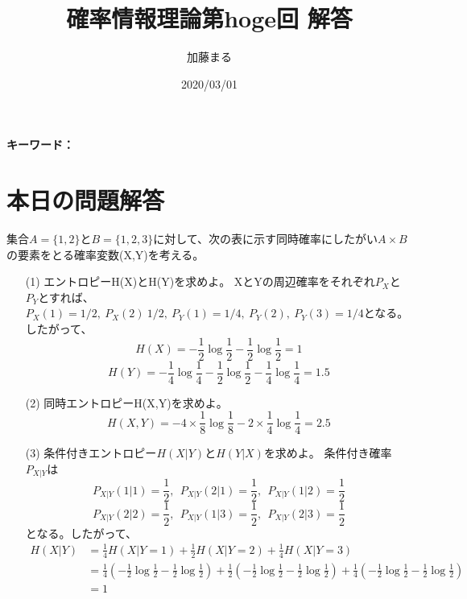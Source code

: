 \documentclass[a4j,uplatex,dvipdfmx]{jsarticle}
\title{確率情報理論第hoge回 解答}
\author{加藤まる}
\date{2020/03/01}
\begin{document}
\maketitle
\bf キーワード：
\rm

\section*{本日の問題解答}
集合$A=\{ 1,2\}$と$B=\{ 1,2,3 \}$に対して、次の表に示す同時確率にしたがい$A \times B$の要素をとる確率変数(X,Y)を考える。
\begin{itemize}
  \item[(1)]エントロピーH(X)とH(Y)を求めよ。
  XとYの周辺確率をそれぞれ$P_X$と$P_Y$とすれば、$P_X(1)=1/2,~P_X(2)~1/2,~P_Y(1)=1/4,~P_Y(2),~P_Y(3)=1/4$となる。
  したがって、
  \begin{equation}
    H(X)=-\frac{1}{2}\log{\frac{1}{2}}-\frac{1}{2}\log{\frac{1}{2}}=1
  \end{equation} 
  \begin{equation}
    H(Y)=-\frac{1}{4}\log{\frac{1}{4}}-\frac{1}{2}\log{\frac{1}{2}}-\frac{1}{4}\log{\frac{1}{4}}=1.5
  \end{equation} 
  \item[(2)]同時エントロピーH(X,Y)を求めよ。
  \begin{equation}
    H(X,Y)=-4\times \frac{1}{8}\log{\frac{1}{8}}-2\times \frac{1}{4}\log{\frac{1}{4}}=2.5
  \end{equation} 
  \item[(3)]条件付きエントロピー$H(X|Y)$と$H(Y|X)$を求めよ。
  条件付き確率$P_{X|Y}$は
  \begin{equation}
    P_{X|Y}(1|1)=\frac{1}{2},~~P_{X|Y}(2|1)=\frac{1}{2},~~P_{X|Y}(1|2)=\frac{1}{2}
  \end{equation} 
  \begin{equation}
    P_{X|Y}(2|2)=\frac{1}{2},~~P_{X|Y}(1|3)=\frac{1}{2},~~P_{X|Y}(2|3)=\frac{1}{2}
  \end{equation}
  となる。したがって、
  \begin{equation}
    \begin{split}
      H(X|Y)&=\frac{1}{4}H(X|Y=1)+\frac{1}{2}H(X|Y=2)+\frac{1}{4}H(X|Y=3)\\
      &=\frac{1}{4}\left( -\frac{1}{2}\log{\frac{1}{2}}-\frac{1}{2}\log{\frac{1}{2}} \right)+\frac{1}{2}\left( -\frac{1}{2}\log{\frac{1}{2}}-\frac{1}{2}\log{\frac{1}{2}} \right)+\frac{1}{4}\left( -\frac{1}{2}\log{\frac{1}{2}}-\frac{1}{2}\log{\frac{1}{2}} \right)\\
      &=1

\end{split}
\end{equation}
\end{itemize}
\end{document}
